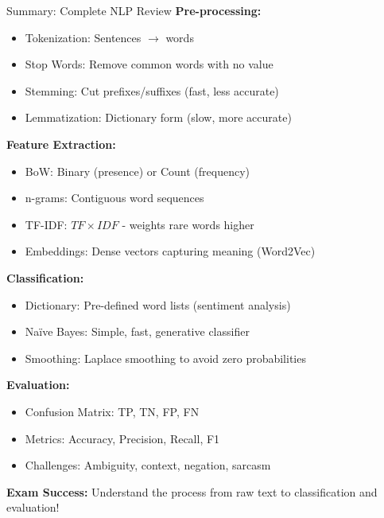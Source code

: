 \documentclass[8pt]{beamer}
\begin{document}
	\begin{frame}{Summary: Complete NLP Review}
		\fontsize{6.5}{7.5}\selectfont
		\textbf{\textcolor{myblue}{Pre-processing:}}
		\begin{itemize}
			\item \textcolor{myblue}{Tokenization:} Sentences $\to$ words
			\item \textcolor{myblue}{Stop Words:} Remove common words with no value
			\item \textcolor{myblue}{Stemming:} Cut prefixes/suffixes (fast, less accurate)
			\item \textcolor{myblue}{Lemmatization:} Dictionary form (slow, more accurate)
		\end{itemize}
		
		\vspace{0.1cm}
		\textbf{\textcolor{myblue}{Feature Extraction:}}
		\begin{itemize}
			\item \textcolor{myblue}{BoW:} Binary (presence) or Count (frequency)
			\item \textcolor{myblue}{n-grams:} Contiguous word sequences
			\item \textcolor{myblue}{TF-IDF:} $TF \times IDF$ - weights rare words higher
			\item \textcolor{myblue}{Embeddings:} Dense vectors capturing meaning (Word2Vec)
		\end{itemize}
		
		\vspace{0.1cm}
		\textbf{\textcolor{myblue}{Classification:}}
		\begin{itemize}
			\item \textcolor{myblue}{Dictionary:} Pre-defined word lists (sentiment analysis)
			\item \textcolor{myblue}{Naïve Bayes:} Simple, fast, generative classifier
			\item \textcolor{myblue}{Smoothing:} Laplace smoothing to avoid zero probabilities
		\end{itemize}
		
		\vspace{0.1cm}
		\textbf{\textcolor{myblue}{Evaluation:}}
		\begin{itemize}
			\item \textcolor{myblue}{Confusion Matrix:} TP, TN, FP, FN
			\item \textcolor{myblue}{Metrics:} Accuracy, Precision, Recall, F1
			\item \textcolor{myblue}{Challenges:} Ambiguity, context, negation, sarcasm
		\end{itemize}
		
		\textcolor{myred}{\textbf{Exam Success:}} Understand the process from raw text to classification and evaluation!
	\end{frame}
	
\end{document}
